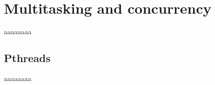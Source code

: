 %
\section{Multitasking and concurrency}
\label{sec:mult-conc}
aaaaaaaa

\subsection{Pthreads}
\label{sec:pthreads}
aaaaaaaa





